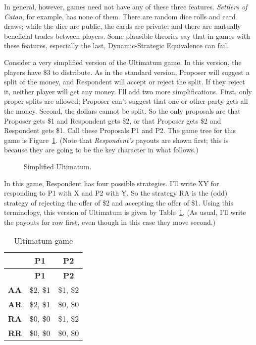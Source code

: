 \documentclass[
  10pt,
  letterpaper,
  DIV=11,
  numbers=noendperiod,
  twoside]{scrartcl}
\begin{document}
In general, however, games need not have any of these three features.
\emph{Settlers of Catan}, for example, has none of them. There are
random dice rolls and card draws; while the dice are public, the cards
are private; and there are mutually beneficial trades between players.
Some plausible theories say that in games with these features,
especially the last, Dynamic-Strategic Equivalence can fail.

Consider a very simplified version of the Ultimatum game. In this
version, the players have \$3 to distribute. As in the standard version,
Proposer will suggest a split of the money, and Respondent will accept
or reject the split. If they reject it, neither player will get any
money. I'll add two more simplifications. First, only proper splits are
allowed; Proposer can't suggest that one or other party gets all the
money. Second, the dollars cannot be split. So the only proposals are
that Proposer gets \$1 and Respondent gets \$2, or that Proposer gets
\$2 and Respondent gets \$1. Call these Proposals P1 and P2. The game
tree for this game is Figure~\ref{fig-ultimatum}. (Note that
\emph{Respondent's} payouts are shown first; this is because they are
going to be the key character in what follows.)

\begin{figure}


\caption{\label{fig-ultimatum}Simplified Ultimatum.}

\end{figure}%

In this game, Respondent has four possible strategies. I'll write XY for
responding to P1 with X and P2 with Y. So the strategy RA is the (odd)
strategy of rejecting the offer of \$2 and accepting the offer of \$1.
Using this terminology, this version of Ultimatum is given by
Table~\ref{tbl-ultimatum}. (As usual, I'll write the payouts for row
first, even though in this case they move second.)

\begin{longtable}[]{@{}rcc@{}}
\caption{Ultimatum game}\label{tbl-ultimatum}\tabularnewline
\toprule\noalign{}
& \textbf{P1} & \textbf{P2} \\
\midrule\noalign{}
\endfirsthead
\toprule\noalign{}
& \textbf{P1} & \textbf{P2} \\
\midrule\noalign{}
\endhead
\bottomrule\noalign{}
\endlastfoot
\textbf{AA} & \$2, \$1 & \$1, \$2 \\
\textbf{AR} & \$2, \$1 & \$0, \$0 \\
\textbf{RA} & \$0, \$0 & \$1, \$2 \\
\textbf{RR} & \$0, \$0 & \$0, \$0 \\
\end{longtable}
\end{document}
